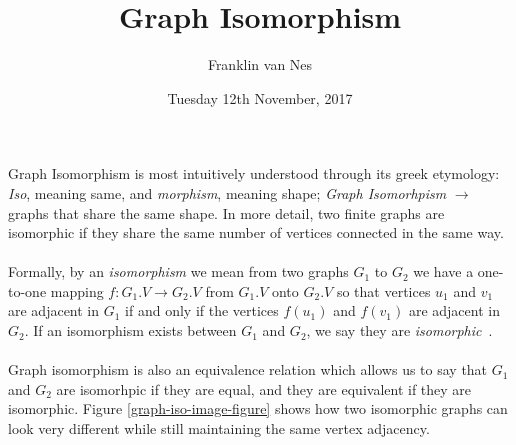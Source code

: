 \documentclass[letterpaper, 12pt]{article}
\begin{document}
\title{Graph Isomorphism}
\author{Franklin van Nes}
\date{Tuesday 12th November, 2017}
\maketitle


    Graph Isomorphism is most intuitively understood through its greek etymology: \textit{Iso}, meaning
     same, and \textit{morphism}, meaning shape; \textit{Graph Isomorhpism} $\rightarrow$ graphs that share the same shape.
    In more detail, two finite graphs are isomorphic if they share the same number of vertices connected in the same way.
    \\\\
    Formally, by an \textit{isomorphism} we mean from two graphs $G_1$ to $G_2$ we have a one-to-one mapping $f: G_1.V \rightarrow G_2.V$ from $G_1.V$ onto $G_2.V$ so
    that vertices $u_1$ and $v_1$ are adjacent in $G_1$ if and only if the vertices $f(u_1)$ and $f(v_1)$ are adjacent in $G_2$.
    If an isomorphism exists between $G_1$ and $G_2$, we say they are \textit{isomorphic}~\cite{gary-definer}.
    \\\\
     Graph isomorphism is also an equivalence relation which allows us to say that $G_1$ and $G_2$ are isomorhpic if they are equal, and they are equivalent if they are isomorphic.
    Figure \ref{graph-iso-image-figure} shows how two isomorphic graphs can look very different while still maintaining the same vertex adjacency.
\end{document}
